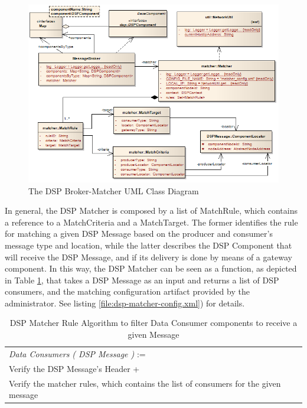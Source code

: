 \begin{figure}[!b]
  \centering
  \includegraphics[scale=0.6]{../diagrams/DSPBroker-Matcher-Class-Diagram}
  \caption{The DSP Broker-Matcher UML Class Diagram}
  \label{fig:DSPBroker-Matcher-Class-Diagram}
\end{figure}

In general, the DSP Matcher is composed by a list of MatchRule, which contains
a reference to a MatchCriteria and a MatchTarget. The former identifies the
rule for matching a given DSP Message based on the producer and consumer's
message type and location, while the latter describes the DSP Component that
will receive the DSP Message, and if its delivery is done by means of a gateway
component. In this way, the DSP Matcher can be seen as a function, as depicted
in Table \ref{tab:matching-rule}, that takes a DSP Message as an input and
returns a list of DSP consumers, and the matching configuration artifact provided by the administrator. See listing
\ref{file:dsp-matcher-config.xml}) for details.

\begin{table}
    \caption{DSP Matcher Rule Algorithm to filter Data Consumer components to
    receive a given Message}
    \begin{center}
        \begin{tabular}{lr}
          \textit{Data Consumers ( DSP Message )} := \\ 
          Verify the DSP Message's Header + \\
          Verify the matcher rules, which contains the list of consumers for
          the given message
        \end{tabular}
    \end{center}
    \label{tab:matching-rule}
\end{table}

